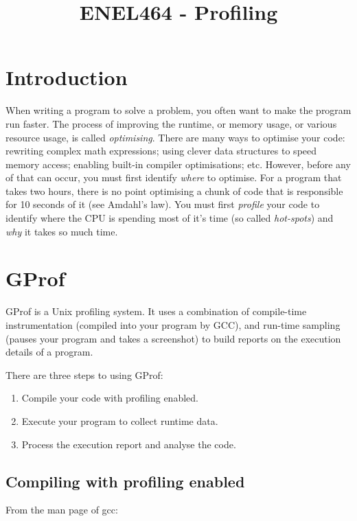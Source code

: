 \documentclass[a4paper,11pt]{article}
\begin{document}
\title{ \bf ENEL464 - Profiling }
\author{}
\date{}
\maketitle


\section{Introduction}

When writing a program to solve a problem, you often want to make the program
run faster. The process of improving the runtime, or memory usage, or various
resource usage, is called \emph{optimising}. There are many ways to optimise
your code: rewriting complex math expressions; using clever data structures to
speed memory access; enabling built-in compiler optimisations; etc. However,
before any of that can occur, you must first identify \emph{where} to optimise.
For a program that takes two hours, there is no point optimising a chunk of code
that is responsible for 10 seconds of it (see Amdahl's law). You must first
\emph{profile} your code to identify where the CPU is spending most of it's time
(so called \emph{hot-spots}) and \emph{why} it takes so much time.

\section{GProf}

GProf is a Unix profiling system. It uses a combination of compile-time
instrumentation (compiled into your program by GCC), and run-time sampling
(pauses your program and takes a screenshot) to build reports on the execution
details of a program.

There are three steps to using GProf:
\begin{enumerate}
    \item Compile your code with profiling enabled.
    \item Execute your program to collect runtime data.
    \item Process the execution report and analyse the code.
\end{enumerate}

\subsection{Compiling with profiling enabled}

From the man page of gcc:
\end{document}
